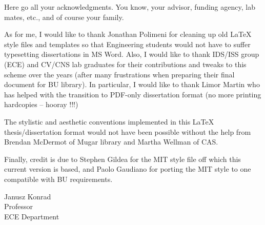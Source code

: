 
Here go all your acknowledgments. You know, your advisor, funding agency, lab
mates, etc., and of course your family.

As for me, I would like to thank Jonathan Polimeni for cleaning up old LaTeX
style files and templates so that Engineering students would not have to suffer
typesetting dissertations in MS Word. Also, I would like to thank IDS/ISS
group (ECE) and CV/CNS lab graduates for their contributions and tweaks to this
scheme over the years (after many frustrations when preparing their final
document for BU library). In particular, I would like to thank Limor Martin who
has helped with the transition to PDF-only dissertation format (no more printing
hardcopies -- hooray !!!)

The stylistic and aesthetic conventions implemented in this LaTeX
thesis/dissertation format would not have been possible without the help from
Brendan McDermot of Mugar library and Martha Wellman of CAS.

Finally, credit is due to Stephen Gildea for the MIT style file off which this
current version is based, and Paolo Gaudiano for porting the MIT style to one
compatible with BU requirements.

\vskip 1in

\noindent
Janusz Konrad\\
Professor\\
ECE Department
